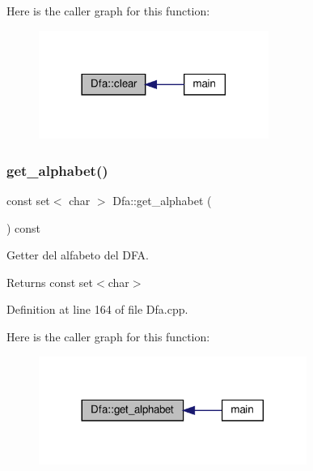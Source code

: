 Here is the caller graph for this function\+:
\nopagebreak
\begin{figure}[H]
\begin{center}
\leavevmode
\includegraphics[width=213pt]{class_dfa_ae04b47677350573031c492799a1c897b_icgraph}
\end{center}
\end{figure}
\mbox{\label{class_dfa_a4483dc3db82de29855237b13a63c42cd}} 
\subsubsection{\texorpdfstring{get\+\_\+alphabet()}{get\_alphabet()}}
{\footnotesize\ttfamily const set$<$ char $>$ Dfa\+::get\+\_\+alphabet (\begin{DoxyParamCaption}{ }\end{DoxyParamCaption}) const}



Getter del alfabeto del D\+FA. 

\begin{DoxyReturn}{Returns}
const set$<$char$>$ 
\end{DoxyReturn}


Definition at line 164 of file Dfa.\+cpp.

Here is the caller graph for this function\+:
\nopagebreak
\begin{figure}[H]
\begin{center}
\leavevmode
\includegraphics[width=248pt]{class_dfa_a4483dc3db82de29855237b13a63c42cd_icgraph}
\end{center}
\end{figure}
\mbox{\label{class_dfa_a5e6cfb28034248d381e2fedb0df3d377}} 
